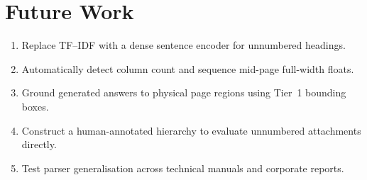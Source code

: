 \documentclass[12pt,a4paper]{report}
\begin{document}
\section{Future Work}
\begin{enumerate}\setlength{\itemsep}{1pt}\setlength{\parskip}{0pt}\setlength{\parsep}{0pt}
  \item Replace TF--IDF with a dense sentence encoder for unnumbered headings.
  \item Automatically detect column count and sequence mid-page full-width floats.
  \item Ground generated answers to physical page regions using Tier~1 bounding boxes.
  \item Construct a human-annotated hierarchy to evaluate unnumbered attachments directly.
  \item Test parser generalisation across technical manuals and corporate reports.
\end{enumerate}
\end{document}
